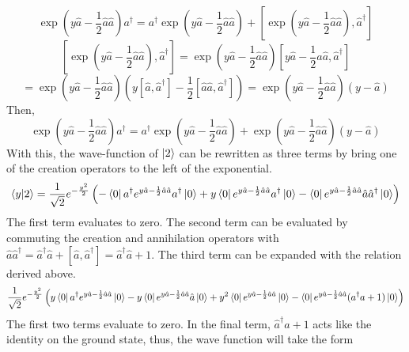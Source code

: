 \begin{sol}
\begin{enumerate}[label=\textbf{(\alph*)}]
    \begin{equation}
	\exp\left(y\hat a-\frac{1}{2}\hat a\hat a\right)a^\dagger =a^\dagger\exp\left(y\hat a-\frac{1}{2}\hat a\hat a\right)+\left[\exp\left(y\hat a-\frac{1}{2}\hat a\hat a\right),\hat a^\dagger\right]
\end{equation} \begin{equation}
	\left[\exp\left(y\hat a-\frac{1}{2}\hat a\hat a\right),\hat a^\dagger\right]=\exp\left(y\hat a-\frac{1}{2}\hat a\hat a\right)\left[y\hat a-\frac{1}{2}\hat a\hat a,\hat a^\dagger\right]
\end{equation}
    \begin{equation}
	=\exp\left(y\hat a-\frac{1}{2}\hat a\hat a\right)\left(y[\hat a, \hat a^\dagger]-\frac{1}{2}[\hat a\hat a,\hat a^\dagger] \right)=\exp\left(y\hat a-\frac{1}{2}\hat a\hat a\right)(y-\hat a)
\end{equation} 
Then,
\begin{equation}
	\exp\left(y\hat a-\frac{1}{2}\hat a\hat a\right)a^\dagger=a^\dagger\exp\left(y\hat a-\frac{1}{2}\hat a\hat a\right)+\exp\left(y\hat a-\frac{1}{2}\hat a\hat a\right)(y-\hat a)
\end{equation}
    With this, the wave-function of $\ket 2$ can be rewritten as three terms by bring one of the creation operators to the left of the exponential.
    \begin{equation}
	\braket{y}{2}=\frac{1}{\sqrt{2}}e^{-\frac{y^2}{2}}\left(-\bra 0a^\dagger e^{y\hat a-\frac{1}{2}\hat a\hat a}a^\dagger\ket 0+y\bra 0e^{y\hat a-\frac{1}{2}\hat a\hat a}a^\dagger\ket 0-\bra 0e^{y\hat a-\frac{1}{2}\hat a\hat a}\hat a\hat a^\dagger\ket 0\right)
\end{equation} 
    The first term evaluates to zero. The second term can be evaluated by commuting the creation and annihilation operators with $\hat a\hat a^\dagger = \hat a^\dagger \hat a+[\hat a, \hat a^\dagger]=\hat a^\dagger \hat a+1$. The third term can be expanded with the relation derived above.
    \begin{equation}
	\frac{1}{\sqrt 2}e^{-\frac{y^2}{2}}\left(y\bra 0a^\dagger e^{y\hat a-\frac{1}{2}\hat a\hat a}\ket 0-y\bra 0e^{y\hat a-\frac{1}{2}\hat a\hat a}\hat a\ket0+y^2\bra 0e^{y\hat a-\frac{1}{2}\hat a\hat a}\ket0-\bra 0e^{y\hat a-\frac{1}{2}\hat a\hat a}(a^\dagger a+1)\ket 0\right)
\end{equation}
    The first two terms evaluate to zero. In the final term, $\hat a^\dagger a+1$ acts like the identity on the ground state, thus, the wave function will take the form
    \begin{equation}

\end{equation}
\end{enumerate}
\end{sol}
